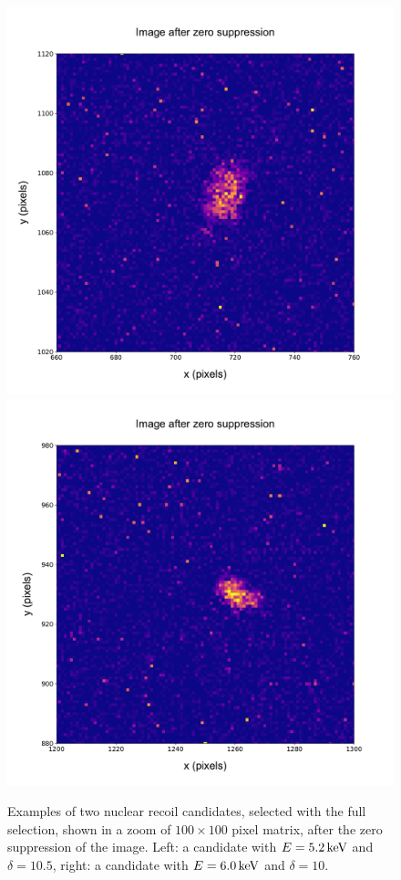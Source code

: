 \begin{figure}[ht]
  \begin{center}
  \includegraphics[width=0.49\linewidth]{figures/pic_run02097_ev59_oriIma_paper}
  \includegraphics[width=0.49\linewidth]{figures/pic_run02097_ev317_oriIma_paper}

  \caption{Examples of two nuclear recoil candidates, selected with
    the full selection, shown in a zoom of $100\times100$ pixel
    matrix, after the zero suppression of the image. Left: a candidate
    with $E=5.2\,\textrm{ke\hspace{-.08em}V}$ and $\delta=10.5$, right: a candidate with
    $E=6.0\,\textrm{ke\hspace{-.08em}V}$ and $\delta=10$.  \label{fig:lowEnergyNR}}

\end{center}
\end{figure}

